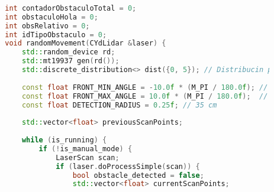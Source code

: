 \begin{lstlisting}[language={C++}, caption={Primer ajuste de c\'odigo}, label={Script}]
        
        
        
        
        
        
        
        
        
        int contadorObstaculoTotal = 0;
        int obstaculoHola = 0;
        int obsRelativo = 0;
        int idTipoObstaculo = 0;
        void randomMovement(CYdLidar &laser) {
            std::random_device rd;
            std::mt19937 gen(rd());
            std::discrete_distribution<> dist({0, 5}); // Distribucin para la probabilidad de movimiento
        
            const float FRONT_MIN_ANGLE = -10.0f * (M_PI / 180.0f); // -15 grados en radaianes
            const float FRONT_MAX_ANGLE = 10.0f * (M_PI / 180.0f);  // 15 grados en radianes
            const float DETECTION_RADIUS = 0.25f; // 35 cm
        
            std::vector<float> previousScanPoints;
        
            while (is_running) {
                if (!is_manual_mode) {
                    LaserScan scan;
                    if (laser.doProcessSimple(scan)) {
                        bool obstacle_detected = false;
                        std::vector<float> currentScanPoints;
                        

\end{lstlisting}
